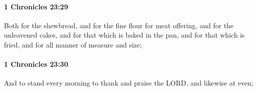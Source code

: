 		\paragraph{1 Chronicles 23:29} %
			\label{1CHRONICLES-23-29}

			Both for the shewbread, and for the fine flour for meat offering, and for the unleavened cakes, and for that which is baked in the pan, and for that which is fried, and for all manner of measure and size;


		\paragraph{1 Chronicles 23:30} %
			\label{1CHRONICLES-23-30}

			And to stand every morning to thank and praise the LORD, and likewise at even;


